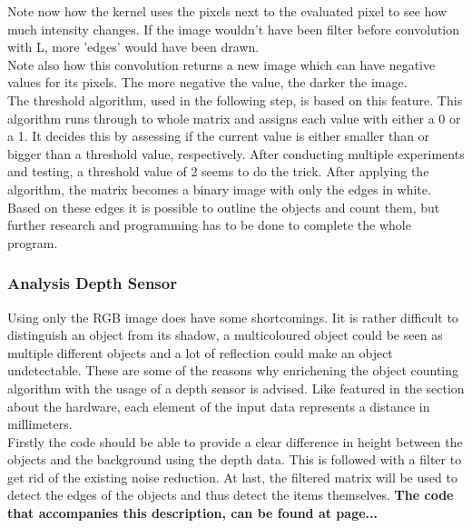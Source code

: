 \documentclass[11pt]{article}
\begin{document}
\noindent Note now how the kernel uses the pixels next to the evaluated pixel to see how much intensity changes. If the image wouldn't have been filter before convolution with L, more 'edges' would have been drawn.\\
Note also how this convolution returns a new image which can have negative values for its pixels. The more negative the value, the darker the image.\\
The threshold algorithm, used in the following step, is based on this feature. This algorithm runs through to whole matrix and assigns each value with either a 0 or a 1. It decides this by assessing if the current value is either smaller than or bigger than a threshold value, respectively. After conducting multiple experiments and testing, a threshold value of 2 seems to do the trick. After applying the algorithm, the matrix becomes a binary image with only the edges in white. Based on these edges it is possible to outline the objects and count them, but further research and programming has to be done to complete the whole program.

\subsubsection{Analysis Depth Sensor}
Using only the RGB image does have some shortcomings. Iit is rather difficult to distinguish an object from its shadow, a multicoloured object could be seen as multiple different objects and a lot of reflection could make an object undetectable. These are some of the reasons why enrichening the object counting algorithm with the usage of a depth sensor is advised. Like featured in the section about the hardware, each element of the input data represents a distance in millimeters.\\
Firstly the code should be able to provide a clear difference in height between the objects and the background using the depth data. This is followed with a filter to get rid of the existing noise reduction. At last, the filtered matrix will be used to detect the edges of the objects and thus detect the items themselves. \textbf{The code that accompanies this description, can be found at page...}
 
\end{document}
